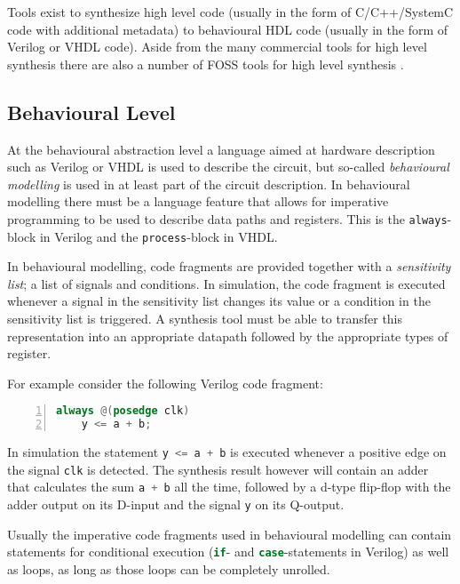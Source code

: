 Tools exist to synthesize high level code (usually in the form of C/C++/SystemC
code with additional metadata) to behavioural HDL code (usually in the form of
Verilog or VHDL code). Aside from the many commercial tools for high level synthesis
there are also a number of FOSS tools for high level synthesis
 .

\subsection{Behavioural Level}

At the behavioural abstraction level a language aimed at hardware description such
as Verilog or VHDL is used to describe the circuit, but so-called {\it behavioural
modelling} is used in at least part of the circuit description. In behavioural
modelling there must be a language feature that allows for imperative programming to be used to
describe data paths and registers. This is the {\tt always}-block in Verilog and
the {\tt process}-block in VHDL.

In behavioural modelling, code fragments are provided together with a {\it
sensitivity list}; a list of signals and conditions. In simulation, the code
fragment is executed whenever a signal in the sensitivity list changes its
value or a condition in the sensitivity list is triggered. A synthesis tool
must be able to transfer this representation into an appropriate datapath followed
by the appropriate types of register.

For example consider the following Verilog code fragment:

\begin{lstlisting}[numbers=left,frame=single,language=Verilog]
always @(posedge clk)
	y <= a + b;
\end{lstlisting}

In simulation the statement \lstinline[language=Verilog]{y <= a + b} is executed whenever
a positive edge on the signal \lstinline[language=Verilog]{clk} is detected. The synthesis
result however will contain an adder that calculates the sum \lstinline[language=Verilog]{a + b}
all the time, followed by a d-type flip-flop with the adder output on its D-input and the
signal \lstinline[language=Verilog]{y} on its Q-output.

Usually the imperative code fragments used in behavioural modelling can contain
statements for conditional execution (\lstinline[language=Verilog]{if}- and
\lstinline[language=Verilog]{case}-statements in Verilog) as well as loops,
as long as those loops can be completely unrolled.

